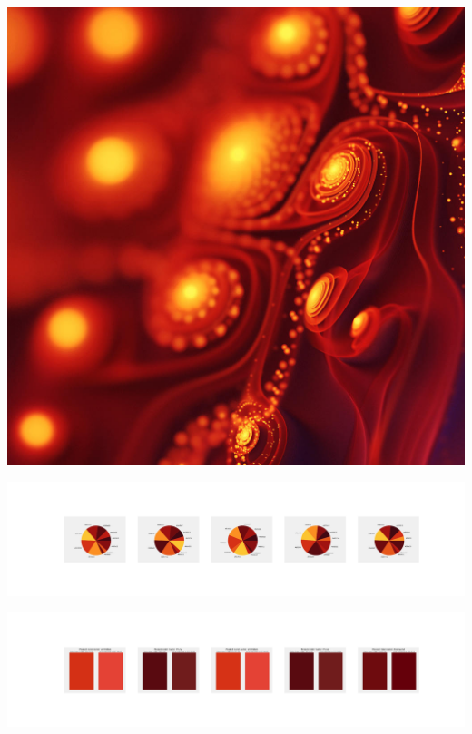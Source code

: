 \documentclass[11pt]{article}
\begin{document}
\begin{landscape}
    \begin{center}
    \includegraphics[width=\textwidth]{./nbimg/file (122).jpg}
    \end{center}

    \begin{center}
    \includegraphics[width=250mm]{./nbimg/pie-26.jpg}
    \end{center}

    \begin{center}
    \includegraphics[width=250mm]{./nbimg/peak-26.jpg}
    \end{center}
    


\end{landscape}
\end{document}
